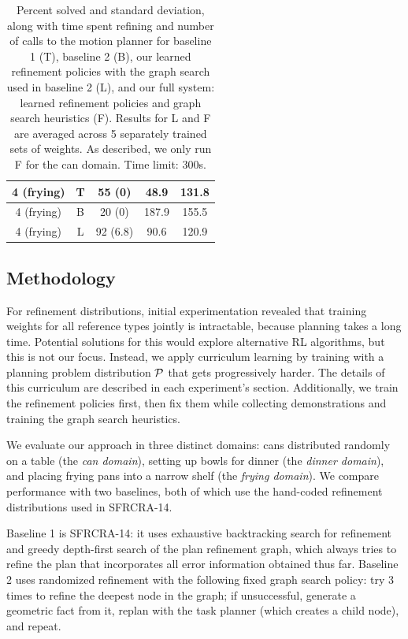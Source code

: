 \begin{table}[t]
{\begin{tabular}{ccccc}
    \midrule[1.5pt]
      4 (frying) & T & 55 (0) & 48.9 & 131.8\\
    \midrule
      4 (frying) & B & 20 (0) & 187.9 & 155.5\\
    \midrule
      4 (frying) & L & 92 (6.8) & 90.6 & 120.9\\
    \bottomrule[1.5pt]
  \end{tabular}}
  \caption{\small{Percent solved and standard deviation, along with time spent refining and number of calls to the motion
planner for baseline 1 (T), baseline 2 (B), our learned refinement policies with the graph search used in baseline 2 (L),
and our full system: learned refinement policies and graph search heuristics (F). Results for L and F
are averaged across 5 separately trained sets of weights. As described, we only run F for the can domain. Time limit: 300s.}}
  \label{table:results}
  \vspace{-1em}
\end{table}

\subsection{Methodology}
For refinement distributions, initial experimentation revealed that training weights for all reference types jointly is intractable,
because planning takes a long time. Potential solutions for this would explore alternative RL algorithms,
but this is not our focus. Instead, we apply curriculum learning by training with a planning problem distribution
$\mathcal{P}$ that gets progressively harder. The details of this curriculum are described in each experiment's section.
Additionally, we train the refinement policies first, then fix them while collecting demonstrations and training the graph search heuristics.

We evaluate our approach in three distinct domains: cans distributed randomly on a table (the \emph{can domain}),
setting up bowls for dinner (the \emph{dinner domain}), and placing frying pans into a narrow shelf (the \emph{frying domain}).
We compare performance with two baselines, both of which use the hand-coded refinement distributions used in SFRCRA-14.

Baseline 1 is SFRCRA-14: it uses exhaustive backtracking search for refinement
and greedy depth-first search of the plan refinement graph, which always tries to refine
the plan that incorporates all error information obtained thus far.
Baseline 2 uses randomized refinement with the following fixed graph search policy: try 3 times to refine the deepest
node in the graph; if unsuccessful, generate a geometric fact from it, replan with the task planner (which creates a child node), and repeat.

